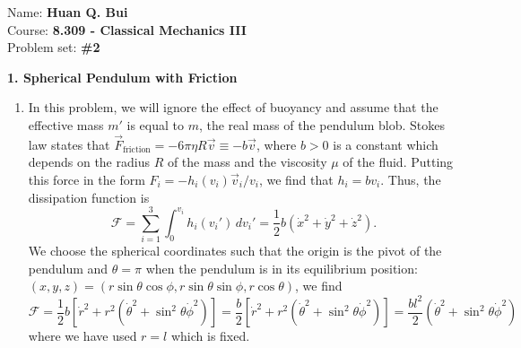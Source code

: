 \documentclass{article}
\theoremstyle{definition}
\newcommand{\f}[2]{\frac{#1}{#2}}
\newcommand{\lb}{\left[}
\newcommand{\rb}{\right]}
\begin{document}
\begin{framed}
	\noindent Name: \textbf{Huan Q. Bui}\\
	Course: \textbf{8.309 - Classical Mechanics III}\\
	Problem set: \textbf{\#2}
\end{framed}
	
	
\noindent \textbf{1. Spherical Pendulum with Friction}
\begin{enumerate}[label = (\alph*)]
	\item In this problem, we will ignore the effect of buoyancy and assume that the effective mass $m'$ is equal to $m$, the real mass of the pendulum blob. Stokes law states that $\vec{F}_\text{friction} = -6\pi \eta R\vec{v} \equiv -b\vec{v}$, where $b>0$ is a constant which depends on the radius $R$ of the mass and the viscosity $\mu$ of the fluid. Putting this force in the form $F_i = -h_i(v_i) \vec{v}_i/v_i$, we find that $h_i = b v_i$. Thus, the dissipation function is 
	\begin{equation*}
	\mathcal{F} = \sum_{i=1}^3  \int_0^{v_i}h_i(v_i') \,dv_i' = \f{1}{2}b(\dot{x}^2+\dot{y}^2+\dot{z}^2).
	\end{equation*}
	We choose the spherical coordinates such that the origin is the pivot of the pendulum and $\theta = \pi$ when the pendulum is in its equilibrium position: $(x,y,z) = (r\sin\theta\cos\phi, r\sin\theta\sin\phi,r\cos\theta)$, we find 
	\begin{equation*}
	\mathcal{F} = \f{1}{2}b\lb \dot{r}^2 + r^2(\dot{\theta}^2 + \sin^2\theta \dot{\phi}^2) \rb = 
	\f{b}{2}\lb \dot{r}^2 + r^2(\dot{\theta}^2 + \sin^2\theta \dot{\phi}^2) \rb = 
	\f{bl^2}{2}(\dot{\theta}^2 + \sin^2\theta \dot{\phi}^2) 
	\end{equation*}
	where we have used $r=l$ which is fixed. 
	

\end{enumerate}
\end{document}
